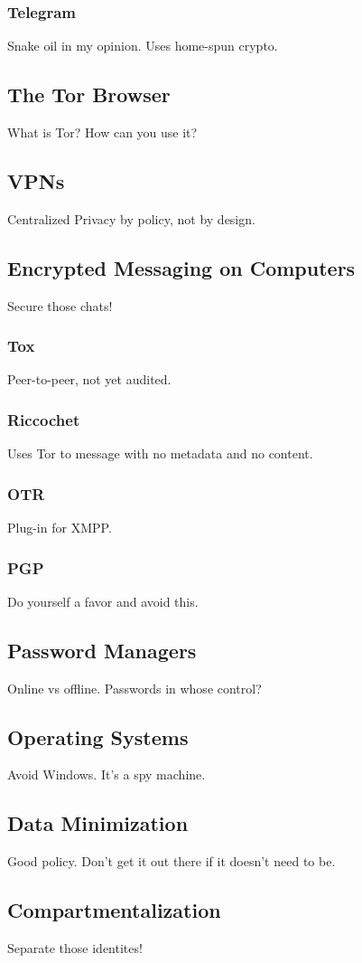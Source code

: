 \subsubsection{Telegram}
Snake oil in my opinion. Uses home-spun crypto.
\subsection{The Tor Browser}
What is Tor? How can you use it?
\subsection{VPNs}
Centralized Privacy by policy, not by design.
\subsection{Encrypted Messaging on Computers}
Secure those chats!
\subsubsection{Tox}
Peer-to-peer, not yet audited. 
\subsubsection{Riccochet}
Uses Tor to message with no metadata and no content.
\subsubsection{OTR}
Plug-in for XMPP.
\subsubsection{PGP}
Do yourself a favor and avoid this.
\subsection{Password Managers}
Online vs offline. Passwords in whose control?
\subsection{Operating Systems}
Avoid Windows. It's a spy machine.
\subsection{Data Minimization}
Good policy. Don't get it out there if it doesn't need to be.
\subsection{Compartmentalization}
Separate those identites!
